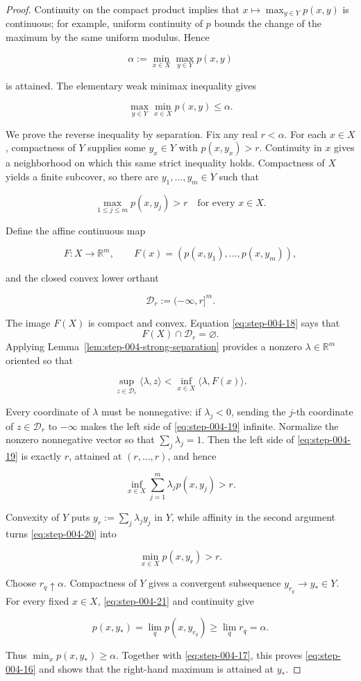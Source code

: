 \begin{proof}
Continuity on the compact product implies that
\(x\mapsto\max_{y\in Y}p(x,y)\) is continuous; for example, uniform
continuity of \(p\) bounds the change of the maximum by the same uniform
modulus. Hence

\[
\alpha:=\min_{x\in X}\max_{y\in Y}p(x,y)
\]

is attained. The elementary weak minimax inequality gives

\[
\max_{y\in Y}\min_{x\in X}p(x,y)\le\alpha.
\tag{S4.17}\label{eq:step-004-17}
\]

We prove the reverse inequality by separation. Fix any real \(r<\alpha\).
For each \(x\in X\), compactness of \(Y\) supplies some \(y_x\in Y\) with
\(p(x,y_x)>r\). Continuity in \(x\) gives a neighborhood on which this same
strict inequality holds. Compactness of \(X\) yields a finite subcover, so
there are \(y_1,\ldots,y_m\in Y\) such that

\[
\max_{1\le j\le m}p(x,y_j)>r
\quad\text{for every }x\in X.
\tag{S4.18}\label{eq:step-004-18}
\]

Define the affine continuous map

\[
F:X\to\mathbb R^m,
\qquad
F(x)=(p(x,y_1),\ldots,p(x,y_m)),
\]

and the closed convex lower orthant

\[
\mathcal D_r:=(-\infty,r]^m.
\]

The image \(F(X)\) is compact and convex.  Equation
\eqref{eq:step-004-18} says that
\[
F(X)\cap\mathcal D_r=\varnothing.
\]
Applying
Lemma~\ref{lem:step-004-strong-separation} provides a nonzero
\(\lambda\in\mathbb R^m\) oriented so that

\[
\sup_{z\in\mathcal D_r}\langle\lambda,z\rangle
<
\inf_{x\in X}\langle\lambda,F(x)\rangle.
\tag{S4.19}\label{eq:step-004-19}
\]

Every coordinate of \(\lambda\) must be nonnegative: if
\(\lambda_j<0\), sending the \(j\)-th coordinate of \(z\in\mathcal D_r\)
to \(-\infty\) makes the left side of \eqref{eq:step-004-19} infinite. Normalize the nonzero
nonnegative vector so that \(\sum_j\lambda_j=1\). Then the left side of
\eqref{eq:step-004-19} is exactly \(r\), attained at \((r,\ldots,r)\), and hence

\[
\inf_{x\in X}\sum_{j=1}^m\lambda_jp(x,y_j)>r.
\tag{S4.20}\label{eq:step-004-20}
\]

Convexity of \(Y\) puts \(y_r:=\sum_j\lambda_jy_j\) in \(Y\), while
affinity in the second argument turns \eqref{eq:step-004-20} into

\[
\min_{x\in X}p(x,y_r)>r.
\tag{S4.21}\label{eq:step-004-21}
\]

Choose \(r_q\uparrow\alpha\). Compactness of \(Y\) gives a convergent
subsequence \(y_{r_q}\to y_*\in Y\). For every fixed \(x\in X\), \eqref{eq:step-004-21} and
continuity give

\[
p(x,y_*)=\lim_q p(x,y_{r_q})\ge\lim_q r_q=\alpha.
\]

Thus \(\min_xp(x,y_*)\ge\alpha\). Together with \eqref{eq:step-004-17}, this proves \eqref{eq:step-004-16} and
shows that the right-hand maximum is attained at \(y_*\). \end{proof}


